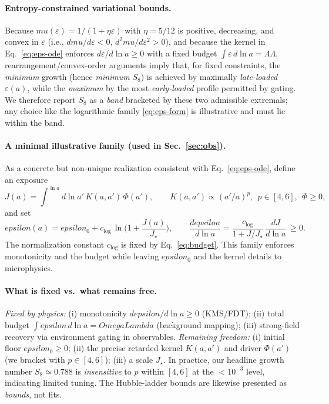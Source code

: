 \documentclass[aps,prd,onecolumn,superscriptaddress,nofootinbib]{revtex4-2}
\def\OmL{OmegaLambda}%
\def\eps{epsilon}%
\def\mu{mu}%
\def\Omega_\Lambda{OmegaLambda}%
\providecommand{\OmL}{\Omega_\Lambda}
\providecommand{\eps}{\varepsilon}
\begin{document}
\paragraph{Entropy-constrained variational bounds.}
Because $\mu(\varepsilon)=1/(1+\eta\varepsilon)$ with $\eta=5/12$ is positive, decreasing, and convex in $\varepsilon$ (i.e., $d\mu/d\varepsilon<0$, $d^2\mu/d\varepsilon^2>0$), and because the kernel in Eq.~\eqref{eq:eps-ode} enforces $d\varepsilon/d\ln a\ge 0$ with a fixed budget $\int\varepsilon\,d\ln a=\Omega_\Lambda$, rearrangement/convex-order arguments imply that, for fixed constraints, the \emph{minimum} growth (hence \emph{minimum} $S_8$) is achieved by maximally \emph{late-loaded} $\varepsilon(a)$, while the \emph{maximum} by the most \emph{early-loaded} profile permitted by gating. We therefore report $S_8$ as a \emph{band} bracketed by these two admissible extremals; any choice like the logarithmic family \eqref{eq:eps-form} is illustrative and must lie within the band.

\paragraph{A minimal illustrative family (used in Sec.~\ref{sec:obs}).}
As a concrete but non-unique realization consistent with Eq.~\eqref{eq:eps-ode}, define an exposure
\begin{equation}
\label{eq:Jdef}
J(a)=\int^{\ln a}\! d\ln a'\, K(a,a')\, \Phi(a'),\qquad K(a,a')\propto (a'/a)^p,\ \ p\in[4,6],\ \ \Phi\ge 0,
\end{equation}
and set
\begin{equation}
\label{eq:eps-form}
\eps(a)=\eps_0+c_{\log}\,\ln\!\Big(1+\frac{J(a)}{J_\star}\Big),\qquad
\frac{d\eps}{d\ln a}=\frac{c_{\log}}{1+J/J_\star}\,\frac{dJ}{d\ln a}\ \ge 0.
\end{equation}
The normalization constant $c_{\log}$ is fixed by Eq.~\eqref{eq:budget}. This family enforces monotonicity and the budget while leaving $\eps_0$ and the kernel details to microphysics.

\paragraph{What is fixed vs.\ what remains free.}
\emph{Fixed by physics:} (i) monotonicity $d\eps/d\ln a\ge 0$ (KMS/FDT); (ii) total budget $\int \eps\, d\ln a=\OmL$ (background mapping); (iii) strong-field recovery via environment gating in observables. \emph{Remaining freedom:} (i) initial floor $\eps_0\ge 0$; (ii) the precise retarded kernel $K(a,a')$ and driver $\Phi(a')$ (we bracket with $p\in[4,6]$); (iii) a scale $J_\star$. In practice, our headline growth number $S_8\simeq 0.788$ is \emph{insensitive} to $p$ within $[4,6]$ at the $<10^{-3}$ level, indicating limited tuning. The Hubble-ladder bounds are likewise presented as \emph{bounds}, not fits.
\end{document}
